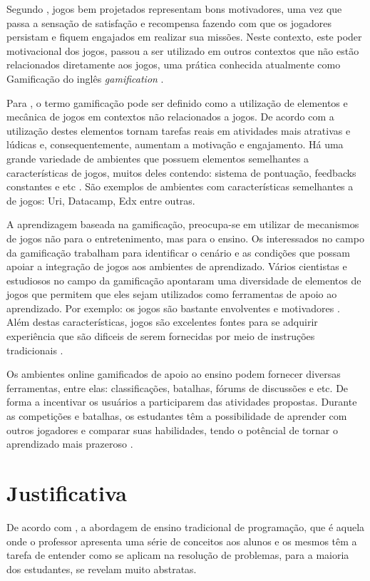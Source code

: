 Segundo , jogos bem projetados representam bons motivadores, uma vez que passa a sensação de satisfação
e recompensa fazendo com que os jogadores persistam e fiquem engajados em realizar sua missões. Neste contexto, este poder
motivacional dos jogos, passou a ser utilizado em outros contextos que não estão relacionados diretamente aos jogos, uma prática 
conhecida atualmente como Gamificação do inglês \textit{gamification} {\itshape}.

Para , o termo gamificação pode ser definido como a utilização de elementos e mecânica de 
jogos em contextos não relacionados a jogos. De acordo com  a utilização destes elementos tornam tarefas reais em atividades
mais atrativas e lúdicas e, consequentemente, aumentam a motivação e engajamento. Há uma grande variedade de ambientes que possuem 
elementos semelhantes a características de jogos, muitos deles contendo: sistema de pontuação, feedbacks constantes e 
etc \cite{6624228}. São exemplos de ambientes com características semelhantes a de jogos: Uri, Datacamp, Edx entre outras.

A aprendizagem baseada na gamificação, preocupa-se em utilizar de mecanismos de jogos não para o entretenimento,
mas para o ensino. Os interessados no campo da gamificação trabalham para identificar o cenário e as condições 
que possam apoiar a integração de jogos aos ambientes de aprendizado. Vários cientistas e estudiosos no campo
da gamificação apontaram uma diversidade de elementos de jogos que permitem que eles sejam utilizados como
ferramentas de apoio ao aprendizado. Por exemplo: os jogos são bastante envolventes \cite{Dickey2005} e motivadores \cite{Prensky:2003:DGL:950566.950596}. Além destas características,
jogos são excelentes fontes para se adquirir experiência que são dificeis de serem fornecidas por meio de instruções tradicionais \cite{Arena2014}.

Os ambientes online gamificados de apoio ao ensino podem fornecer diversas ferramentas, entre elas: classificações, batalhas, fórums de discussões e etc.
De forma a incentivar os usuários a participarem das atividades propostas. 
Durante as competições e batalhas, os estudantes têm a possibilidade de aprender com outros jogadores e comparar suas habilidades, tendo o potêncial de tornar o aprendizado mais
prazeroso \cite{LearningProgramming}. 

\pagebreak

\section{Justificativa}
De acordo com , a abordagem de ensino tradicional de programação, que é aquela onde o professor apresenta
uma série de conceitos aos alunos e os mesmos têm a tarefa de entender como se aplicam na resolução de problemas,
para a maioria dos estudantes, se revelam muito abstratas.

